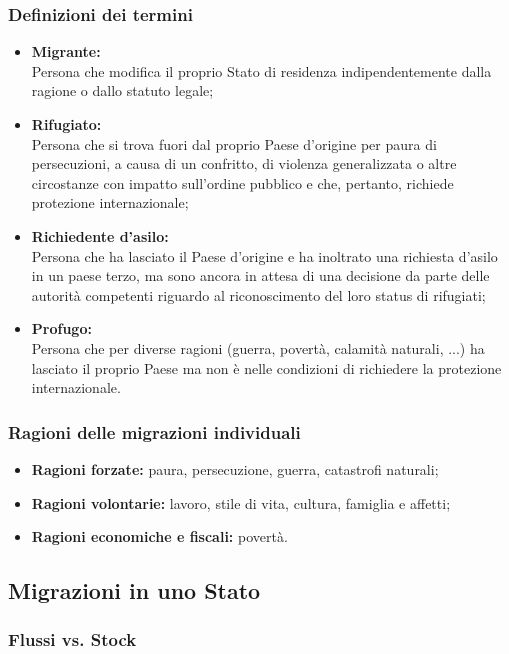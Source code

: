 \documentclass{article}
\begin{document}
\subsubsection{Definizioni dei termini}
\begin{itemize}
    \item \textbf{Migrante:}\\
        Persona che modifica il proprio Stato di residenza indipendentemente dalla ragione o
        dallo statuto legale;
    \item \textbf{Rifugiato:}\\
        Persona che si trova fuori dal proprio Paese d'origine per paura di persecuzioni, a
        causa di un confritto, di violenza generalizzata o altre circostanze con impatto
        sull'ordine pubblico e che, pertanto, richiede protezione internazionale;
    \item \textbf{Richiedente d'asilo:}\\
        Persona che ha lasciato il Paese d'origine e ha inoltrato una richiesta d'asilo in un
        paese terzo, ma sono ancora in attesa di una decisione da parte delle autorità
        competenti riguardo al riconoscimento del loro status di rifugiati;
    \item \textbf{Profugo:}\\
        Persona che per diverse ragioni (guerra, povertà, calamità naturali, ...) ha lasciato
        il proprio Paese ma non è nelle condizioni di richiedere la protezione internazionale.
\end{itemize}

\subsubsection{Ragioni delle migrazioni individuali}
\begin{itemize}
    \item \textbf{Ragioni forzate:} paura, persecuzione, guerra, catastrofi naturali;
    \item \textbf{Ragioni volontarie:} lavoro, stile di vita, cultura, famiglia e affetti;
    \item \textbf{Ragioni economiche e fiscali:} povertà.
\end{itemize}

\subsection{Migrazioni in uno Stato}
\subsubsection{Flussi vs. Stock}
\end{document}
